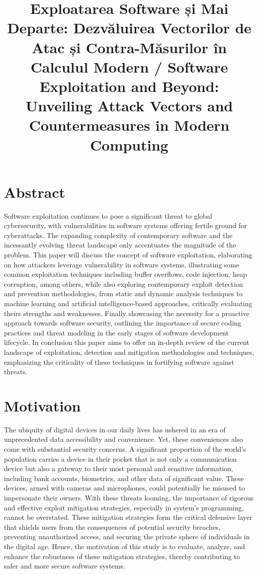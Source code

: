 \documentclass{article}
\begin{document}
\title{Exploatarea Software și Mai Departe: Dezvăluirea Vectorilor de Atac și Contra-Măsurilor în Calculul Modern / Software Exploitation and Beyond: Unveiling Attack Vectors and Countermeasures in Modern Computing}
\maketitle
\section{Abstract}%

Software exploitation continues to pose a significant threat to global
cybersecurity, with vulnerabilities in software systems offering fertile ground
for cyberattacks. The expanding complexity of contemporary software and the
incessantly evolving threat landscape only accentuates the magnitude of the
problem. This paper will discuss the concept of software exploitation,
elaborating on how attackers leverage vulnerability in software systems,
illustrating some common exploitation techniques including buffer overflows,
code injection, heap corruption, among others, while also exploring contemporary
exploit detection and prevention methodologies, from static and dynamic analysis
techniques to machine learning and artificial intelligence-based approaches,
critically evaluating theirs strengths and weaknesses. Finally showcasing the
necessity for a proactive approach towards software security, outlining the
importance of secure coding practices and threat modeling in the early stages of
software development lifecycle. In conclusion this paper aims to offer an
in-depth review of the current landscape of exploitation, detection and
mitigation methodologies and techniques, emphasizing the criticality of these
techniques in fortifying software against threats.

\section{Motivation}%
The ubiquity of digital devices in our daily lives has ushered in an era of
unprecedented data accessibility and convenience. Yet, these conveniences also
come with substantial security concerns. A significant proportion of the world's
population carries a device in their pocket that is not only a communication
device but also a gateway to their most personal and sensitive information,
including bank accounts, biometrics, and other data of significant value. These
devices, armed with cameras and microphones, could potentially be misused to
impersonate their owners. With these threats looming, the importance of rigorous
and effective exploit mitigation strategies, especially in system's programming,
cannot be overstated. These mitigation strategies form the critical defensive
layer that shields users from the consequences of potential security breaches,
preventing unauthorized access, and securing the private sphere of individuals
in the digital age. Hence, the motivation of this study is to evaluate, analyze,
and enhance the robustness of these mitigation strategies, thereby contributing
to safer and more secure software systems.
\end{document}
